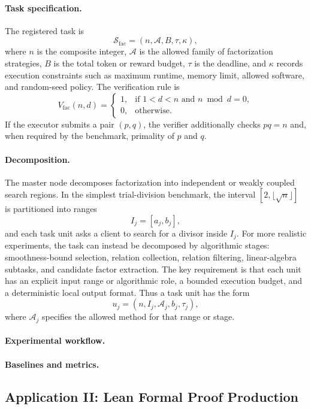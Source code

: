 \documentclass{article}
\theoremstyle{plain}
\begin{document}
{\paragraph{Task specification.}
The registered task is
\[
\mathcal{S}_{\mathrm{fac}}=(n,\mathcal{A},B,\tau,\kappa),
\]
where $n$ is the composite integer, $\mathcal{A}$ is the allowed family of factorization strategies, $B$ is the total token or reward budget, $\tau$ is the deadline, and $\kappa$ records execution constraints such as maximum runtime, memory limit, allowed software, and random-seed policy. The verification rule is
\[
V_{\mathrm{fac}}(n,d)=
\begin{cases}
1, & \text{if } 1<d<n \text{ and } n\bmod d=0,\\
0, & \text{otherwise}.
\end{cases}
\]
If the executor submits a pair $(p,q)$, the verifier additionally checks $pq=n$ and, when required by the benchmark, primality of $p$ and $q$.

\paragraph{Decomposition.}
The master node decomposes factorization into independent or weakly coupled search regions. In the simplest trial-division benchmark, the interval $[2,\lfloor \sqrt{n}\rfloor]$ is partitioned into ranges
\[
I_j=[a_j,b_j],
\]
and each task unit asks a client to search for a divisor inside $I_j$. For more realistic experiments, the task can instead be decomposed by algorithmic stages: smoothness-bound selection, relation collection, relation filtering, linear-algebra subtasks, and candidate factor extraction. The key requirement is that each unit has an explicit input range or algorithmic role, a bounded execution budget, and a deterministic local output format. Thus a task unit has the form
\[
u_j=(n,I_j,\mathcal{A}_j,b_j,\tau_j),
\]
where $\mathcal{A}_j$ specifies the allowed method for that range or stage.

\paragraph{Experimental workflow.}

\paragraph{Baselines and metrics.}


\subsection{Application II: Lean Formal Proof Production}

}
\end{document}

